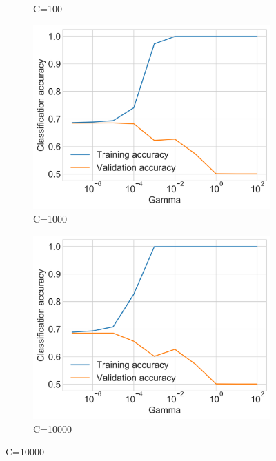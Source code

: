\begin{figure}[h]
\begin{subfigure}{0.5\textwidth}
        \caption{C=100}
        \label{figure:svm_validation_C_100}
    \end{subfigure}
    \begin{subfigure}{0.5\textwidth}
        \centering
        \includegraphics[width=\textwidth]{figures/charts/svm_validation_C_1000.png}
        \caption{C=1000}
        \label{figure:svm_validation_C_1000}
    \end{subfigure}
    \begin{subfigure}{0.5\textwidth}
        \centering
        \includegraphics[width=\textwidth]{figures/charts/svm_validation_C_10000.png}
        \caption{C=10000}
        \label{figure:svm_validation_C_10000}

\end{subfigure}
\end{figure}
